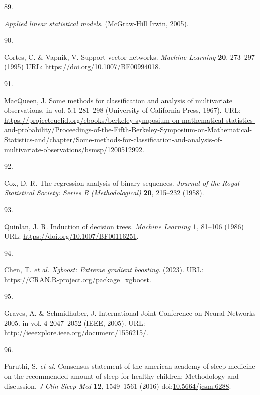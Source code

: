 \documentclass[
  10pt,
]{scrbook}
\newlength{\cslhangindent}
\newlength{\csllabelwidth}
\newlength{\cslentryspacingunit} %
\newenvironment{CSLReferences}[2] %
 {%
  \setlength{\parindent}{0pt}
  \ifodd #1
  \let\oldpar\par
  \def\par{\hangindent=\cslhangindent\oldpar}
  \fi
  \setlength{\parskip}{#2\cslentryspacingunit}
 }%
 {}
\newcommand{\CSLLeftMargin}[1]{\parbox[t]{\csllabelwidth}{#1}}
\newcommand{\CSLRightInline}[1]{\parbox[t]{\linewidth - \csllabelwidth}{#1}\break}
\begin{document}
\begin{CSLReferences}{0}{0}
\leavevmode{}%
\CSLLeftMargin{89. }%
\CSLRightInline{\emph{Applied linear statistical models}. (McGraw-Hill
Irwin, 2005).}

\leavevmode{}%
\CSLLeftMargin{90. }%
\CSLRightInline{Cortes, C. \& Vapnik, V. Support-vector networks.
\emph{Machine Learning} \textbf{20}, 273--297 (1995) URL:
\url{https://doi.org/10.1007/BF00994018}.}

\leavevmode{}%
\CSLLeftMargin{91. }%
\CSLRightInline{MacQueen, J. Some methods for classification and
analysis of multivariate observations. in vol. 5.1 281--298 (University
of California Press, 1967). URL:
\url{https://projecteuclid.org/ebooks/berkeley-symposium-on-mathematical-statistics-and-probability/Proceedings-of-the-Fifth-Berkeley-Symposium-on-Mathematical-Statistics-and/chapter/Some-methods-for-classification-and-analysis-of-multivariate-observations/bsmsp/1200512992}.}

\leavevmode{}%
\CSLLeftMargin{92. }%
\CSLRightInline{Cox, D. R. The regression analysis of binary sequences.
\emph{Journal of the Royal Statistical Society: Series B
(Methodological)} \textbf{20}, 215--232 (1958).}

\leavevmode{}%
\CSLLeftMargin{93. }%
\CSLRightInline{Quinlan, J. R. Induction of decision trees.
\emph{Machine Learning} \textbf{1}, 81--106 (1986) URL:
\url{https://doi.org/10.1007/BF00116251}.}

\leavevmode{}%
\CSLLeftMargin{94. }%
\CSLRightInline{Chen, T. \emph{et al.} \emph{Xgboost: Extreme gradient
boosting}. (2023). URL:
\url{https://CRAN.R-project.org/package=xgboost}.}

\leavevmode{}%
\CSLLeftMargin{95. }%
\CSLRightInline{Graves, A. \& Schmidhuber, J. International Joint
Conference on Neural Networks 2005. in vol. 4 2047--2052 (IEEE, 2005).
URL: \url{http://ieeexplore.ieee.org/document/1556215/}.}

\leavevmode{}%
\CSLLeftMargin{96. }%
\CSLRightInline{Paruthi, S. \emph{et al.} Consensus statement of the
american academy of sleep medicine on the recommended amount of sleep
for healthy children: Methodology and discussion. \emph{J Clin Sleep
Med} \textbf{12}, 1549--1561 (2016)
doi:\href{https://doi.org/10.5664/jcsm.6288}{10.5664/jcsm.6288}.}


\end{CSLReferences}
\end{document}
